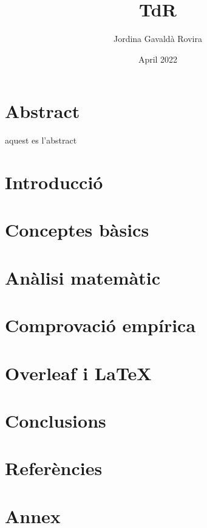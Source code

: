 \documentclass[12pt, oneside, Times New Roman]{report}
\title{TdR}
\author{Jordina Gavaldà Rovira}
\date{April 2022}
\begin{document}


\pagestyle{empty}
\tableofcontents
{}

\listoffigures

\newpage

\pagestyle{fancy}

\chapter*{Abstract}
aquest es l'abstract 

\chapter*{Introducció}


\setcounter{chapter}{0}
\chapter{Conceptes bàsics} 


\chapter{Anàlisi matemàtic}


\chapter{Comprovació empírica}


\chapter{Overleaf i \LaTeX}


\chapter{Conclusions}


\chapter{Referències}


\chapter{Annex}



\end{document}
